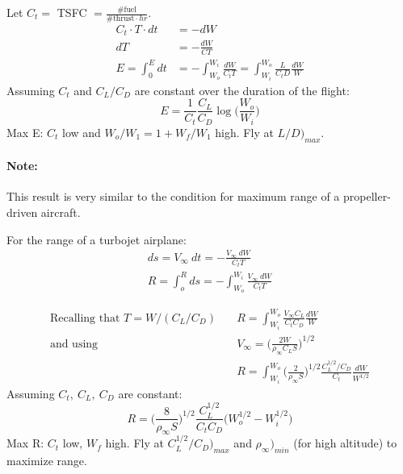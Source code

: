 \documentclass[draft=false, titlepage]{article}
\begin{document}
\noindent Let $C_t = $ TSFC $= \frac{\text{\# fuel}}{\text{\# thrust}\cdot hr}$.
\begin{align*}
C_t \cdot T \cdot dt &= -dW\\
dT &= -\frac{dW}{CT}\\
E = \int_0^Edt &= -\int_{W_o}^{W_i} \frac{dW}{C_t T} = \int_{W_i}^{W_o} \frac{L}{C_t D}\frac{dW}{W}
\end{align*}
Assuming $C_t$ and $C_L/C_D$ are constant over the duration of the flight:
\begin{equation}
\boxed{E = \frac{1}{C_t}\frac{C_L}{C_D}\log \Big( \frac{W_o}{W_i} \Big)}
\end{equation}
Max E: $C_t$ low and $W_o/W_1 = 1 + W_f/W_1$ high. Fly at $L/D\big)_{max}$.
\paragraph*{Note:} This result is very similar to the condition for maximum range of a propeller-driven aircraft.

\noindent For the range of a turbojet airplane:
\begin{gather*}
ds = V_\infty\ dt = -\frac{V_\infty\ dW}{C_t T}\\
R = \int_o^R ds = -\int_{W_o}^{W_i} \frac{V_\infty\ dW}{C_t T}
\end{gather*}

\begin{align*}
\text{Recalling that }T = W/(C_L/C_D) &\quad
R = \int_{W_i}^{W_o}\frac{V_\infty C_L}{C_t C_D}\frac{dW}{W}\\
\text{and using} &\quad V_\infty = \Big(\frac{2W}{\rho_\infty C_L S}\Big)^{1/2}\\
&\quad R = \int_{W_i}^{W_o} \Big(
\frac{2}{\rho_\infty S}\Big)^{1/2}\frac{C_L^{1/2}/C_D}{C_t} \frac{dW}{W^{1/2}}
\end{align*}
Assuming $C_t,\ C_L,\ C_D$ are constant:
\begin{equation}
\boxed{R = \Big(\frac{8}{\rho_\infty S}\Big)^{1/2} \frac{C_L^{1/2}}{C_t C_D} \Big( W_o^{1/2} - W_i^{1/2} \Big)}
\end{equation}
Max R: $C_t$ low, $W_f$ high. Fly at $C_L^{1/2}/C_D\big)_{max}$ and $\rho_\infty\big)_{min}$ (for high altitude) to maximize range.
\end{document}
